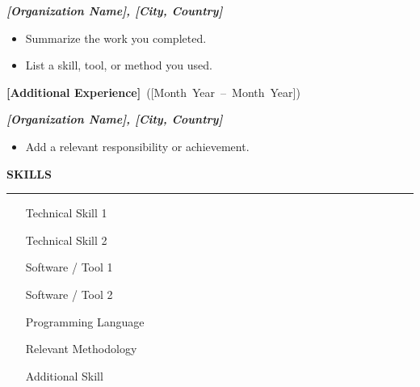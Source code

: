 \documentclass[10pt,a4paper]{article}
\newcommand{\sideheading}[1]{%
  {\fontsize{16.5}{19}\selectfont
   \bfseries\color{muted} #1\par}%
  \vspace{0.8mm}
  \hrule height 0.42pt
  \vspace{2.7mm}%
}
\newcommand{\jobtitle}[2]{%
  \vspace{2.0mm}
  {\bfseries #1}\ \mbox{(#2)}\par
}
\newcommand{\employer}[1]{%
  {\bfseries\itshape #1}\par
}
\newenvironment{cvitems}{%
  \begin{itemize}[
    leftmargin=7.7mm,
    label=\textbullet,
    itemsep=0.4mm,
    topsep=1.4mm,
    parsep=0pt,
    partopsep=0pt
  ]
}{\end{itemize}}
\begin{document}
\begin{minipage}[t]{128.7mm}
\begin{minipage}[t]{122.7mm}
    \employer{[Organization Name], [City, Country]}

    \begin{cvitems}
      \item [Summarize the work you completed.]
      \item [List a skill, tool, or method you used.]
    \end{cvitems}


    \jobtitle{[Additional Experience]}
      {[Month Year -- Month Year]}

    \employer{[Organization Name], [City, Country]}

    \begin{cvitems}
      \item [Add a relevant responsibility or achievement.]
    \end{cvitems}

  \end{minipage}
\end{minipage}


\newpage

\fontsize{10.7}{15.3}\selectfont
\noindent


\begin{minipage}[t]{81.3mm}
  \vspace*{3.9mm}
  \hspace*{5.7mm}%

  \begin{minipage}[t]{68mm}
    \raggedright
    \fontsize{11.2}{15.2}\selectfont


    \sideheading{SKILLS}

    \fontsize{10.7}{15.2}\selectfont

    \begin{itemize}[
      leftmargin=6.2mm,
      topsep=0mm,
      itemsep=2.0mm,
      parsep=0pt
    ]
      \item [Technical Skill 1]
      \item [Technical Skill 2]
      \item [Software / Tool 1]
      \item [Software / Tool 2]
      \item [Programming Language]
      \item [Relevant Methodology]
      \item [Additional Skill]
    \end{itemize}

  \end{minipage}
\end{minipage}%
\end{document}
